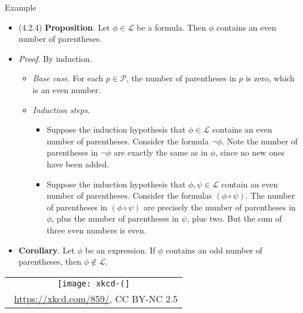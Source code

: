 \begin{frame}{Example}


	\begin{itemize}
	
		\item (4.2.4) \textbf{Proposition}. Let $\phi\in\mathcal{L}$ be a formula. Then $\phi$ contains an even number of parentheses.
		
		\item \emph{Proof}. By induction. 
				
		\begin{itemize}
	
		\item \emph{Base case}. For each $p\in\mathcal{P}$, the number of parentheses in $p$ is zero, which is an even number.
		
		\item \emph{Induction steps.}
		
		\begin{itemize}
		
			\item Suppose the induction hypothesis that $\phi\in\mathcal{L}$ contains an even number of parentheses. Consider the formula $\neg\phi$. Note the number of parentheses in $\neg\phi$ are exactly the same as in $\phi$, since no new ones have been added.
			
			\item Suppose the induction hypothesis that $\phi,\psi\in\mathcal{L}$ contain an even number of parentheses. Consider the formulas $(\phi\circ\psi)$. The number of parentheses in $(\phi\circ\psi)$ are precisely the number of parentheses in $\phi$, plus the number of parentheses in $\psi$, plus two.	 But the sum of three even numbers is even.	
		\end{itemize}
	
	\end{itemize}
		
	\item \textbf{Corollary}. Let $\phi$ be an expression. If $\phi$ contains an odd number of parentheses, then $\phi\notin\mathcal{L}$.
	
	\end{itemize}


\end{frame}

\begin{frame}

\begin{center}
		\begin{tabular}{c}
		\texttt{[image: xkcd-(]}\\[-1ex]
		{\tiny \textcopyright~\url{https://xkcd.com/859/}, CC BY-NC 2.5}
		\end{tabular}
		\end{center}

\end{frame}

